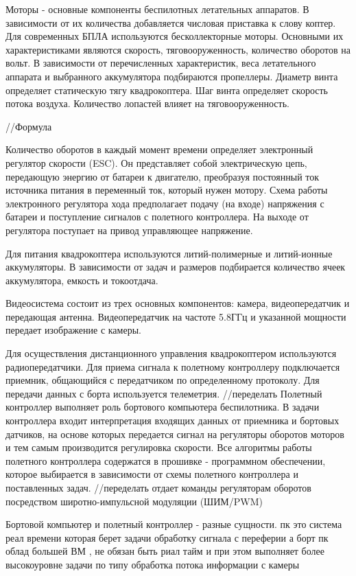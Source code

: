 Моторы - основные компоненты беспилотных летательных аппаратов. В зависимости от их количества добавляется числовая приставка к слову коптер. Для современных БПЛА используются бесколлекторные моторы. Основными их характеристиками являются скорость, тяговооруженность, количество оборотов на вольт. В зависимости от перечисленных характеристик, веса летательного аппарата и выбранного аккумулятора подбираются пропеллеры.
Диаметр винта определяет статическую тягу квадрокоптера. Шаг винта определяет скорость потока воздуха. Количество лопастей влияет на тяговооруженность.

//Формула 

Количество оборотов в каждый момент времени определяет электронный регулятор скорости (ESC). Он представляет собой электрическую цепь, передающую энергию от батареи к двигателю, преобразуя постоянный ток источника питания в переменный ток, который нужен мотору. Схема работы электронного регулятора хода предполагает подачу (на входе) напряжения с батареи и поступление сигналов с полетного контроллера. На выходе от регулятора поступает на привод управляющее напряжение. 

Для питания квадрокоптера используются литий-полимерные и литий-ионные аккумуляторы. В зависимости от задач и размеров подбирается количество ячеек аккумулятора, емкость и токоотдача.

Видеосистема состоит из трех основных компонентов: камера, видеопередатчик и передающая антенна.
Видеопередатчик на частоте 5.8ГГц и указанной мощности передает изображение с камеры.

Для осуществления дистанционного управления квадрокоптером используются радиопередатчики. Для приема сигнала к полетному контроллеру подключается приемник, общающийся с передатчиком по определенному протоколу. Для передачи данных с борта используется телеметрия.
//переделать
Полетный контроллер выполняет роль бортового компьютера беспилотника. В задачи контроллера входит интерпретация входящих данных от приемника и бортовых датчиков, на основе которых передается сигнал на регуляторы оборотов моторов и тем самым производится регулировка скорости. Все алгоритмы работы полетного контроллера содержатся в прошивке - программном обеспечении, которое выбирается в зависимости от схемы полетного контроллера и поставленных задач.
//переделать
отдает команды регуляторам оборотов посредством широтно-импульсной модуляции (ШИМ/PWM)

Бортовой компьютер и полетный контроллер - разные сущности.
пк это система реал времени которая берет задачи обработку сигнала с переферии
а борт пк облад большей ВМ , не обязан быть риал тайм и при этом выполняет более высокоуровне задачи по типу обработка потока информации с камеры

